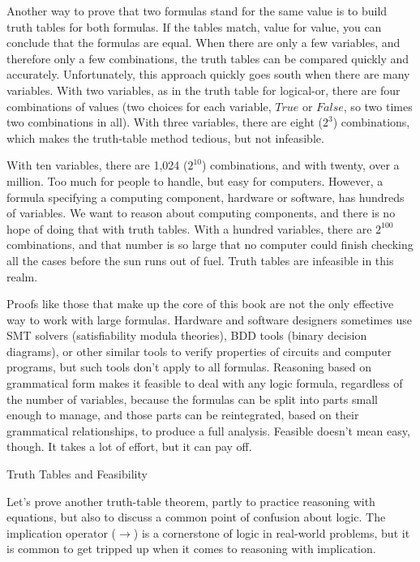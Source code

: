 \begin{aside}
Another way to prove that two formulas stand
for the same value is to build truth tables for both formulas.
If the tables match, value for value, you can conclude that
the formulas are equal.
When there are only a few variables, and therefore only a few combinations,
the truth tables can be compared quickly and accurately.
Unfortunately, this approach quickly goes south when there are many variables.
With two variables, as in the truth table
for logical-or, there are four combinations of values
(two choices for each variable, $True$ or $False$, so two times two
combinations in all). With three variables, there are eight
($2^3$) combinations, which makes the truth-table method tedious,
but not infeasible.

With ten variables, there are 1,024 ($2^{10}$) combinations,
and with twenty, over a million.
Too much for people to handle, but easy for computers.
However, a formula specifying a computing component,
hardware or software, has hundreds of variables.
We want to reason about computing components,
and there is no hope of doing that with truth tables.
With a hundred variables, there are $2^{100}$ combinations,
and that number is so large that no computer could
finish checking all the cases before the sun runs out of fuel.
Truth tables are infeasible in this realm.

Proofs like those that make up the core of this book
are not the only effective way to work with large formulas.
Hardware and software designers sometimes use
SMT solvers (satisfiability modula theories),
BDD tools (binary decision diagrams), or other similar tools
to verify properties of circuits and computer programs,
but such tools don't apply to all formulas.
Reasoning based on grammatical form
makes it feasible to deal with any logic formula,
regardless of the number of variables,
because the formulas can be split into parts small enough
to manage, and those parts can be reintegrated, based on
their grammatical relationships, to produce a full analysis.
Feasible doesn't mean easy, though.
It takes a lot of effort, but it can pay off.
\caption{Truth Tables and Feasibility}
\label{feasibility}
\end{aside}

Let's prove another truth-table theorem, partly to practice
reasoning with equations, but also to discuss a common
point of confusion about logic. The implication operator
($\rightarrow$) is a cornerstone of logic in real-world problems,
but it is common to get tripped up when it comes to
reasoning with implication.

